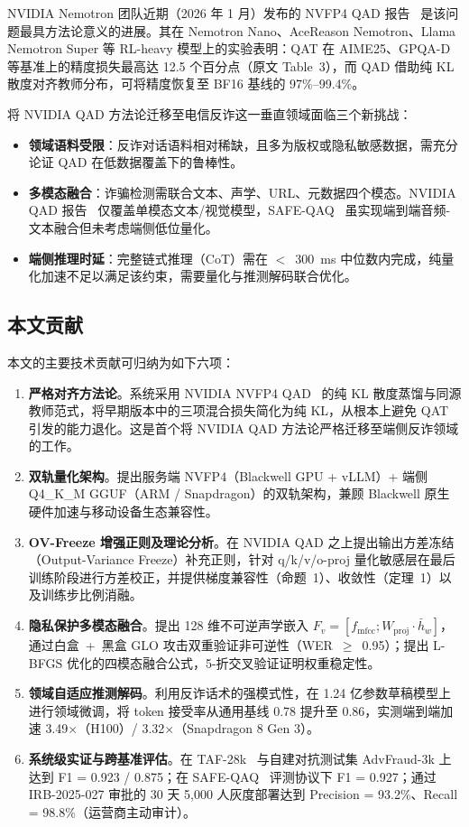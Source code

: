 \documentclass[UTF8,a4paper,10pt,twocolumn]{ctexart}
\theoremstyle{plain}
\begin{document}
NVIDIA Nemotron 团队近期（2026 年 1 月）发布的 NVFP4 QAD 报告~\cite{xin2026qad} 是该问题最具方法论意义的进展。其在 Nemotron Nano、AceReason Nemotron、Llama Nemotron Super 等 RL-heavy 模型上的实验表明：QAT 在 AIME25、GPQA-D 等基准上的精度损失最高达 12.5 个百分点（原文 Table~3），而 QAD 借助纯 KL 散度对齐教师分布，可将精度恢复至 BF16 基线的 97\%--99.4\%。

将 NVIDIA QAD 方法论迁移至电信反诈这一垂直领域面临三个新挑战：

\begin{itemize}
\item[\textbf{(C1)}] \textbf{领域语料受限}：反诈对话语料相对稀缺，且多为版权或隐私敏感数据，需充分论证 QAD 在低数据覆盖下的鲁棒性。
\item[\textbf{(C2)}] \textbf{多模态融合}：诈骗检测需联合文本、声学、URL、元数据四个模态。NVIDIA QAD 报告~\cite{xin2026qad} 仅覆盖单模态文本/视觉模型，SAFE-QAQ~\cite{wang2026safe} 虽实现端到端音频-文本融合但未考虑端侧低位量化。
\item[\textbf{(C3)}] \textbf{端侧推理时延}：完整链式推理（CoT）需在 $<$~300~ms 中位数内完成，纯量化加速不足以满足该约束，需要量化与推测解码联合优化。
\end{itemize}

\subsection{本文贡献}

本文的主要技术贡献可归纳为如下六项：

\begin{enumerate}
\item \textbf{严格对齐方法论}。系统采用 NVIDIA NVFP4 QAD~\cite{xin2026qad} 的纯 KL 散度蒸馏与同源教师范式，将早期版本中的三项混合损失简化为纯 KL，从根本上避免 QAT 引发的能力退化。这是首个将 NVIDIA QAD 方法论严格迁移至端侧反诈领域的工作。
\item \textbf{双轨量化架构}。提出服务端 NVFP4（Blackwell GPU + vLLM）+ 端侧 Q4\_K\_M GGUF（ARM / Snapdragon）的双轨架构，兼顾 Blackwell 原生硬件加速与移动设备生态兼容性。
\item \textbf{OV-Freeze 增强正则及理论分析}。在 NVIDIA QAD 之上提出输出方差冻结（Output-Variance Freeze）补充正则，针对 q/k/v/o-proj 量化敏感层在最后训练阶段进行方差校正，并提供梯度兼容性（命题~1）、收敛性（定理~1）以及训练步比例消融。
\item \textbf{隐私保护多模态融合}。提出 128 维不可逆声学嵌入 $F_v = [f_{\mathrm{mfcc}}; W_{\mathrm{proj}} \cdot \bar{h}_w]$，通过白盒~+~黑盒 GLO 攻击双重验证非可逆性（WER~$\geq$~0.95）；提出 L-BFGS 优化的四模态融合公式，5-折交叉验证证明权重稳定性。
\item \textbf{领域自适应推测解码}。利用反诈话术的强模式性，在 1.24 亿参数草稿模型上进行领域微调，将 token 接受率从通用基线 0.78 提升至 0.86，实测端到端加速 3.49$\times$（H100）/ 3.32$\times$（Snapdragon 8 Gen 3）。
\item \textbf{系统级实证与跨基准评估}。在 TAF-28k~\cite{ma2025teleantifraud} 与自建对抗测试集 AdvFraud-3k 上达到 F1 = 0.923 / 0.875；在 SAFE-QAQ~\cite{wang2026safe} 评测协议下 F1 = 0.927；通过 IRB-2025-027 审批的 30 天 5,000 人灰度部署达到 Precision = 93.2\%、Recall = 98.8\%（运营商主动审计）。
\end{enumerate}
\end{document}
